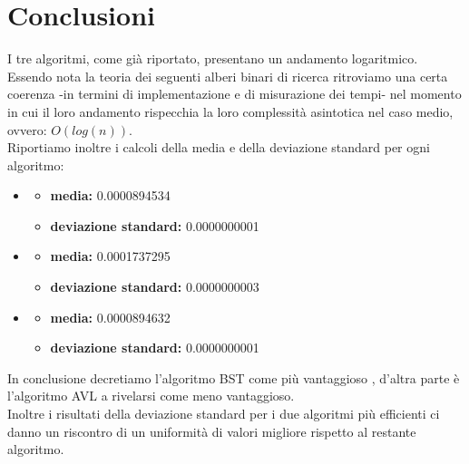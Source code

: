 \documentclass[a4paper,11pt]{report}
\begin{document}
    \chapter{Conclusioni}
    I tre algoritmi, come già riportato, presentano un andamento logaritmico. Essendo nota la teoria dei seguenti alberi binari di ricerca ritroviamo una certa coerenza -in termini di implementazione e di misurazione dei tempi- nel momento in cui il loro andamento rispecchia la loro complessità asintotica nel caso medio, ovvero: $O(log(n))$.
    \\Riportiamo inoltre i calcoli della media e della deviazione standard per ogni algoritmo:
    \begin{itemize}
        \item {\color{Blue}{BST}}
        \begin{itemize}
            \item \textbf{media:} 0.0000894534
            \item \textbf{deviazione standard:} 0.0000000001
        \end{itemize}
        \item {\color{Red}{AVL}}
        \begin{itemize}
            \item \textbf{media:} 0.0001737295
            \item \textbf{deviazione standard:} 0.0000000003
        \end{itemize}
        \item {\color{Green}{RBT}}
        \begin{itemize}
            \item \textbf{media:} 0.0000894632
            \item \textbf{deviazione standard:} 0.0000000001
        \end{itemize}
    \end{itemize}
    In conclusione decretiamo l'algoritmo BST come più vantaggioso , d'altra parte è l'algoritmo AVL a rivelarsi come meno vantaggioso.
    \\Inoltre i risultati della deviazione standard per i due algoritmi più efficienti ci danno un riscontro di un uniformità di valori migliore rispetto al restante algoritmo.
\end{document}
